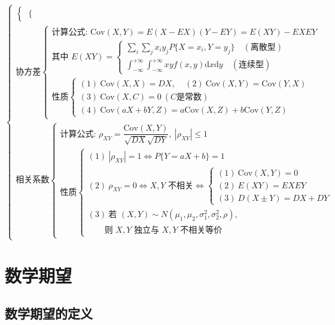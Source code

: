 \documentclass[lang=cn,11pt]{elegantbook}
\begin{document}
{\[\begin{cases}
\begin{cases}
\begin{cases}
\end{cases}
\end{cases} \\
\text{协方差}
\begin{cases}
\text{计算公式: } \text{Cov}(X,Y)=E(X-EX)(Y-EY)=E(XY)-EXEY \\
\text{其中 } E(XY)=
\begin{cases}
\sum\limits_{i}\sum\limits_{j} x_i y_j P\{X=x_i,Y=y_j\} \quad (\text{离散型}) \\
\int_{-\infty}^{+\infty}\int_{-\infty}^{+\infty} xy f(x,y) \mathrm{d}x\mathrm{d}y \quad (\text{连续型})
\end{cases} \\
\text{性质}
\begin{cases}
(1)\ \text{Cov}(X,X)=DX ,~~~~~(2)\ \text{Cov}(X,Y)=\text{Cov}(Y,X) \\
(3)\ \text{Cov}(X,C)=0 \ (C \text{是常数}) \\
(4)\ \text{Cov}(aX+bY,Z)=a\text{Cov}(X,Z)+b\text{Cov}(Y,Z)
\end{cases}
\end{cases} \\
\text{相关系数}
\begin{cases}
\text{计算公式: } \rho_{XY}=\dfrac{\text{Cov}(X,Y)}{\sqrt{DX}\sqrt{DY}},\ |\rho_{XY}|\leqslant1 \\
\text{性质}
\begin{cases}
(1)\ |\rho_{XY}|=1 \Leftrightarrow P\{Y=aX+b\}=1 \\
(2)\ \rho_{XY}=0 \Leftrightarrow X,Y \text{ 不相关} \Leftrightarrow
\begin{cases}
(1)\ \text{Cov}(X,Y)=0 \\
(2)\ E(XY)=EXEY \\
(3)\ D(X\pm Y)=DX+DY
\end{cases} \\
(3)\ \text{若 } (X,Y)\sim N(\mu_1,\mu_2,\sigma_1^2,\sigma_2^2,\rho), \\
\qquad \text{则 } X,Y \text{ 独立与 } X,Y \text{ 不相关等价}
\end{cases}
\end{cases}
\end{cases}
\]
}

\section{数学期望}

\subsection{数学期望的定义}
\end{document}
